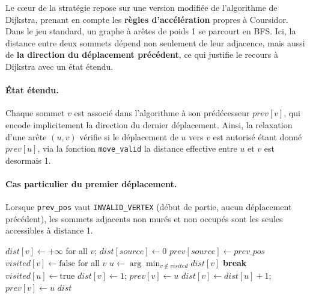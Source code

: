 \documentclass[12pt,a4paper]{article}
\begin{document}
Le cœur de la stratégie repose sur une version modifiée de l'algorithme de 
Dijkstra, prenant en compte les \textbf{règles d'accélération} propres à Coursidor. 
Dans le jeu standard, un graphe à arêtes de poids 1 se parcourt en BFS. Ici, 
la distance entre deux sommets dépend non seulement de leur adjacence, mais 
aussi de \textbf{la direction du déplacement précédent}, ce qui justifie le recours à Dijkstra avec un état étendu.

\paragraph{État étendu.} Chaque sommet $v$ est associé dans l'algorithme à 
son prédécesseur $prev[v]$, qui encode implicitement la direction du dernier 
déplacement. Ainsi, la relaxation d'une arête $(u, v)$ vérifie si le 
déplacement de $u$ vers $v$ est autorisé étant donné $prev[u]$, via la 
fonction \texttt{move\_valid} la distance effective entre $u$ et $v$ est desormais 1.

\paragraph{Cas particulier du premier déplacement.} Lorsque \texttt{prev\_pos} 
vaut \texttt{INVALID\_VERTEX} (début de partie, aucun déplacement précédent), 
les sommets adjacents non murés et non occupés sont les seules accessibles à distance 1.

\begin{algorithm}
\caption{Dijkstra with directional state}
\begin{algorithmic}[1]
    \State $dist[v] \gets +\infty$ for all $v$; $dist[source] \gets 0$
    \State $prev[source] \gets prev\_pos$
    \State $visited[v] \gets \text{false}$ for all $v$
        \State $u \gets \arg\min_{v \notin visited} dist[v]$
         \textbf{break} \EndIf
        \State $visited[u] \gets \text{true}$
                \State $dist[v] \gets 1$; $prev[v] \gets u$
            \EndFor
        \Else
                    \State $dist[v] \gets dist[u] + 1$; $prev[v] \gets u$
                \EndIf
            \EndFor
        \EndIf
    \EndFor
    \State \Return $dist$
\EndFunction
\end{algorithmic}
\end{algorithm}
\end{document}
